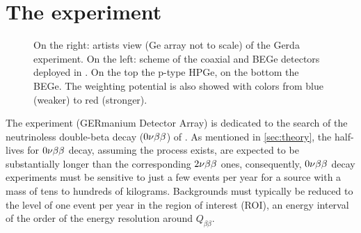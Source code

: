 \section{The {\gerda} experiment}\label{sec:gerda}
\begin{figure}[b!]
	\centering
	\caption{On the right: artists view (Ge array not to scale) of the Gerda experiment. On the left: scheme of the coaxial and BEGe detectors deployed in {\gerda}. On the top the p-type HPGe, on the bottom the BEGe. The weighting potential is also showed with colors from blue (weaker) to red (stronger).}
	\label{fig:artistviewanddet}
\end{figure}
The {\gerda} experiment \cite{gerdadescription} (GERmanium Detector Array) is dedicated to the search of the neutrinoless double-beta decay ($0\nu\beta\beta$) of . As mentioned in \cref{sec:theory}, the half-lives for $0\nu\beta\beta$ decay, assuming the process exists, are expected to be substantially longer than the corresponding $2\nu\beta\beta$ ones, consequently, $0\nu\beta\beta$ decay experiments must be sensitive to just a few events per year for a source with a mass of tens to hundreds of kilograms. Backgrounds must typically be reduced to the level of one event per year in the region of interest (ROI), an energy interval of the order of the energy resolution around $Q_{\beta\beta}$. 

